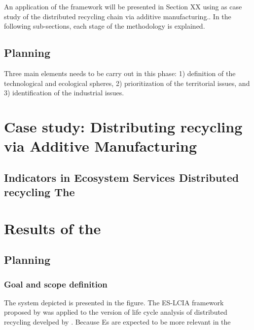 \documentclass[
]{article}
\begin{document}
An application of the framework will be presented in Section XX using as case study of the distributed recycling chain via additive manufacturing..
In the following sub-sections, each stage of the methodology is explained.

\hypertarget{planning}{%
\subsection{Planning}\label{planning}}

Three main elements needs to be carry out in this phase: 1) definition of the technological and ecological spheres, 2) prioritization of the territorial issues, and 3) identification of the industrial issues.

\hypertarget{case-study-distributing-recycling-via-additive-manufacturing}{%
\section{Case study: Distributing recycling via Additive Manufacturing}\label{case-study-distributing-recycling-via-additive-manufacturing}}

\hypertarget{indicators-in-ecosystem-services-distributed-recycling-the}{%
\subsection{Indicators in Ecosystem Services Distributed recycling The}\label{indicators-in-ecosystem-services-distributed-recycling-the}}

\newpage

\hypertarget{results-of-the}{%
\section{Results of the}\label{results-of-the}}

\hypertarget{planning-1}{%
\subsection{Planning}\label{planning-1}}

\hypertarget{goal-and-scope-definition}{%
\subsubsection{Goal and scope definition}\label{goal-and-scope-definition}}

The system depicted is presented in the figure.
The ES-LCIA framework proposed by was applied to the version of life cycle analysis of distributed recycling develped by .
Because Es are expected to be more relevant in the
\end{document}
